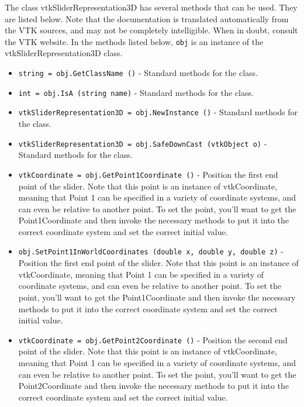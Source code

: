 The class vtkSliderRepresentation3D has several methods that can be used.
  They are listed below.
Note that the documentation is translated automatically from the VTK sources,
and may not be completely intelligible.  When in doubt, consult the VTK website.
In the methods listed below, \verb|obj| is an instance of the vtkSliderRepresentation3D class.
\begin{itemize}
\item  \verb|string = obj.GetClassName ()| -  Standard methods for the class.

\item  \verb|int = obj.IsA (string name)| -  Standard methods for the class.

\item  \verb|vtkSliderRepresentation3D = obj.NewInstance ()| -  Standard methods for the class.

\item  \verb|vtkSliderRepresentation3D = obj.SafeDownCast (vtkObject o)| -  Standard methods for the class.

\item  \verb|vtkCoordinate = obj.GetPoint1Coordinate ()| -  Position the first end point of the slider. Note that this point is an
 instance of vtkCoordinate, meaning that Point 1 can be specified in a
 variety of coordinate systems, and can even be relative to another
 point. To set the point, you'll want to get the Point1Coordinate and
 then invoke the necessary methods to put it into the correct coordinate
 system and set the correct initial value.

\item  \verb|obj.SetPoint1InWorldCoordinates (double x, double y, double z)| -  Position the first end point of the slider. Note that this point is an
 instance of vtkCoordinate, meaning that Point 1 can be specified in a
 variety of coordinate systems, and can even be relative to another
 point. To set the point, you'll want to get the Point1Coordinate and
 then invoke the necessary methods to put it into the correct coordinate
 system and set the correct initial value.

\item  \verb|vtkCoordinate = obj.GetPoint2Coordinate ()| -  Position the second end point of the slider. Note that this point is an
 instance of vtkCoordinate, meaning that Point 1 can be specified in a
 variety of coordinate systems, and can even be relative to another
 point. To set the point, you'll want to get the Point2Coordinate and
 then invoke the necessary methods to put it into the correct coordinate
 system and set the correct initial value.


\end{itemize}
